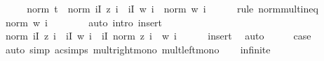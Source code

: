 \begin{isabellebody}
\ \ \isamarkupfalse%
\ \isamarkupfalse%
\ {\isachardoublequoteopen}norm\ {\isacharquery}{\kern0pt}t{}\ {\isasymle}\ norm\ {\isacharparenleft}{\kern0pt}{\isacharparenleft}{\kern0pt}{\isasymProd}i{\isasymin}I{\isachardot}{\kern0pt}\ z\ i{\isacharparenright}{\kern0pt}\ {\isacharminus}{\kern0pt}\ {\isacharparenleft}{\kern0pt}{\isasymProd}i{\isasymin}I{\isachardot}{\kern0pt}\ w\ i{\isacharparenright}{\kern0pt}{\isacharparenright}{\kern0pt}\ {\isacharasterisk}{\kern0pt}\ norm\ {\isacharparenleft}{\kern0pt}w\ i{\isacharparenright}{\kern0pt}{\isachardoublequoteclose}\isanewline
\ \ \ \ \isamarkupfalse%
\ {\isacharparenleft}{\kern0pt}rule\ norm{\isacharunderscore}{\kern0pt}mult{\isacharunderscore}{\kern0pt}ineq{\isacharparenright}{\kern0pt}\isanewline
\ \ \isamarkupfalse%
\ \isamarkupfalse%
\ {\isachardoublequoteopen}norm\ {\isacharparenleft}{\kern0pt}w\ i{\isacharparenright}{\kern0pt}\ {\isasymle}\ {}{\isachardoublequoteclose}\isanewline
\ \ \ \ \isamarkupfalse%
\ {\isacharparenleft}{\kern0pt}auto\ intro{\isacharcolon}{\kern0pt}\ insert{\isacharparenright}{\kern0pt}\isanewline
\ \ \isamarkupfalse%
\ \isamarkupfalse%
\ {\isachardoublequoteopen}norm\ {\isacharparenleft}{\kern0pt}{\isacharparenleft}{\kern0pt}{\isasymProd}i{\isasymin}I{\isachardot}{\kern0pt}\ z\ i{\isacharparenright}{\kern0pt}\ {\isacharminus}{\kern0pt}\ {\isacharparenleft}{\kern0pt}{\isasymProd}i{\isasymin}I{\isachardot}{\kern0pt}\ w\ i{\isacharparenright}{\kern0pt}{\isacharparenright}{\kern0pt}\ {\isasymle}\ {\isacharparenleft}{\kern0pt}{\isasymSum}i{\isasymin}I{\isachardot}{\kern0pt}\ norm\ {\isacharparenleft}{\kern0pt}z\ i\ {\isacharminus}{\kern0pt}\ w\ i{\isacharparenright}{\kern0pt}{\isacharparenright}{\kern0pt}{\isachardoublequoteclose}\isanewline
\ \ \ \ \isamarkupfalse%
\ insert\ \isamarkupfalse%
\ auto\isanewline
\ \ \isamarkupfalse%
\ \isamarkupfalse%
\ {\isacharquery}{\kern0pt}case\isanewline
\ \ \ \ \isamarkupfalse%
\ {\isacharparenleft}{\kern0pt}auto\ simp{\isacharcolon}{\kern0pt}\ ac{\isacharunderscore}{\kern0pt}simps\ mult{\isacharunderscore}{\kern0pt}right{\isacharunderscore}{\kern0pt}mono\ mult{\isacharunderscore}{\kern0pt}left{\isacharunderscore}{\kern0pt}mono{\isacharparenright}{\kern0pt}\isanewline
{}\isamarkupfalse%
\isanewline
\ \ \isamarkupfalse%
\ infinite\isanewline
\ \ \isamarkupfalse%
\ \isamarkupfalse%

\end{isabellebody}
